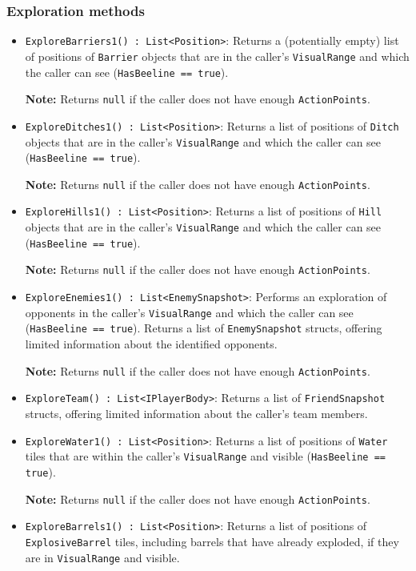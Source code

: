 \documentclass[a4paper,english,DIV=16,11pt,parskip=half,dvipsnames,listof=totoc,index=totoc,bibliography=totoc]{scrartcl}
\begin{document}
\subsubsection{Exploration methods} \label{sssec:explMeth}
\begin{itemize}
  \item \texttt{ExploreBarriers1() :~List<Position>}: Returns a (potentially empty) list of positions of \texttt{Barrier} objects that are in the caller's \texttt{VisualRange} and which the caller can see (\texttt{HasBeeline == true}).
  
  \faLightbulbO\: \textbf{Note:} Returns \texttt{null} if the caller does not have enough \texttt{ActionPoints}.
  \item \texttt{ExploreDitches1() :~List<Position>}: Returns a list of positions of \texttt{Ditch} objects that are in the caller's \texttt{VisualRange} and which the caller can see (\texttt{HasBeeline == true}).
  
  \faLightbulbO\: \textbf{Note:} Returns \texttt{null} if the caller does not have enough \texttt{ActionPoints}.
  \item \texttt{ExploreHills1() :~List<Position>}: Returns a list of positions of \texttt{Hill} objects that are in the caller's \texttt{VisualRange} and which the caller can see (\texttt{HasBeeline == true}).
  
  \faLightbulbO\: \textbf{Note:} Returns \texttt{null} if the caller does not have enough \texttt{ActionPoints}.
  \item \texttt{ExploreEnemies1() :~List<EnemySnapshot>}: Performs an exploration of opponents in the caller's \texttt{VisualRange} and which the caller can see (\texttt{HasBeeline == true}). Returns a list of \texttt{EnemySnapshot} structs, offering limited information about the identified opponents.
  
  \faLightbulbO\: \textbf{Note:} Returns \texttt{null} if the caller does not have enough \texttt{ActionPoints}.
  \item \texttt{ExploreTeam() :~List<IPlayerBody>}: Returns a list of \texttt{FriendSnapshot} structs, offering limited information about the caller's team members.
  \item \texttt{ExploreWater1() :~List<Position>}: Returns a list of positions of \texttt{Water} tiles that are within the caller's \texttt{VisualRange} and visible (\texttt{HasBeeline == true}).
  
  \faLightbulbO\: \textbf{Note:} Returns \texttt{null} if the caller does not have enough \texttt{ActionPoints}.
  \item \texttt{ExploreBarrels1() :~List<Position>}: Returns a list of positions of \texttt{ExplosiveBarrel} tiles, including barrels that have already exploded, if they are in \texttt{VisualRange} and visible.
  

\end{itemize}
\end{document}
